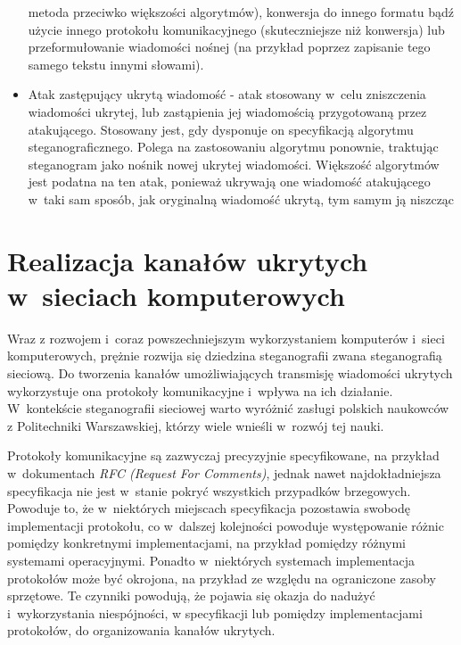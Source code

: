 \documentclass[a4paper, twoside, openright, 12pt]{report}
\begin{document}
\begin{itemize}
                metoda przeciwko większości algorytmów), konwersja do innego formatu
                bądź użycie innego protokołu komunikacyjnego (skuteczniejsze niż konwersja) lub
                przeformułowanie wiadomości nośnej (na przykład poprzez zapisanie tego samego tekstu
                innymi słowami).
            \item Atak zastępujący ukrytą wiadomość - atak stosowany w~celu zniszczenia
                wiadomości ukrytej, lub zastąpienia jej wiadomością przygotowaną przez atakującego.
                Stosowany jest, gdy dysponuje on specyfikacją algorytmu steganograficznego.
                Polega na zastosowaniu algorytmu ponownie, traktując steganogram jako nośnik
                nowej ukrytej wiadomości. Większość algorytmów jest podatna na ten
                atak, ponieważ ukrywają one wiadomość atakującego w~taki sam sposób,
                jak oryginalną wiadomość ukrytą, tym samym ją niszcząc
        \end{itemize}


        \chapter{Realizacja kanałów ukrytych w~sieciach komputerowych} \label{NETWORKSTEGANOGRAPHY}
    Wraz z rozwojem i~coraz powszechniejszym wykorzystaniem komputerów i~sieci
    komputerowych, prężnie rozwija się dziedzina steganografii zwana steganografią
    sieciową. Do tworzenia kanałów umożliwiających transmisję wiadomości ukrytych
    wykorzystuje ona protokoły komunikacyjne i~wpływa na ich działanie. W~kontekście
    steganografii sieciowej warto wyróżnić zasługi polskich naukowców z Politechniki
    Warszawskiej, którzy wiele wnieśli w~rozwój tej nauki\cite{STEGANOGRAFIASIECIOWAART}.

    Protokoły komunikacyjne są zazwyczaj
    precyzyjnie specyfikowane, na przykład w~dokumentach \emph{RFC (Request For Comments)},
    jednak nawet najdokładniejsza
    specyfikacja nie jest w~stanie pokryć wszystkich przypadków brzegowych. Powoduje
    to, że w~niektórych miejscach specyfikacja pozostawia swobodę implementacji protokołu,
    co w~dalszej kolejności powoduje występowanie różnic pomiędzy konkretnymi
    implementacjami, na przykład pomiędzy różnymi systemami operacyjnymi. Ponadto
    w~niektórych systemach implementacja protokołów może być okrojona, na przykład
    ze względu na ograniczone zasoby sprzętowe. Te czynniki
    powodują, że pojawia się okazja do nadużyć i~wykorzystania niespójności, w specyfikacji
    lub pomiędzy implementacjami protokołów, do organizowania
    kanałów ukrytych.
\end{document}
